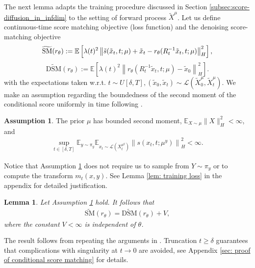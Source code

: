 \documentclass[10pt]{article} %
\newcommand{\E}{\mathbb{E}}
\theoremstyle{plain}
\newtheorem{lemma}[theorem]{Lemma}
\theoremstyle{definition}
\newtheorem{assumption}[theorem]{Assumption}
\theoremstyle{remark}
\renewcommand{\L}{\mathscr{L}}
\newcommand{\norm}[1]{\left\|#1\right\|}
\begin{document}
The next lemma adapts the training procedure discussed in Section \ref{subsec:score-diffusion_in_infdim} to the setting of forward process $\widetilde X^{\mu}$. Let us define continuous-time score matching objective (loss function) and the denoising score-matching objective 
\begin{equation*}\label{eq:loss-objective}
     \widetilde{\mathrm{SM}}(r_\theta) := \E\left[\lambda(t)^2\norm{\Tilde{s}(\tilde x_t, t; \mu) + \tilde x_t -r_\theta(R_t^{-1} \tilde x_t, t; \mu)}_H^2\right],
\end{equation*}
    \begin{equation*}
        \widetilde{\mathrm{DSM}}(r_\theta) := \E \left[\lambda(t)^2 \norm{r_\theta(R_t^{-1} \tilde x_t, t; \mu) - \tilde x_0}_H^2\right].
    \end{equation*}
with the expectations taken w.r.t. $ t \sim U[\delta, T], (\tilde x_0, \tilde x_t) \sim \L(\widetilde{X}^{\mu}_0, \widetilde{X}_t^{\mu})$.
We make an assumption regarding the boundedness of the second moment of the conditional score uniformly in time following \citet{baldassari2024conditional}.
\begin{assumption}\label{ass: stability estimate; no forward process}
       The prior $\mu$ has bounded second moment, $\E_{X\sim\mu}\|X\|_H^2 < \infty$, and
    \begin{eqnarray*}
    \sup_{t \in [\delta, T]} \E_{y \sim \pi_y} \E_{x_t \sim \L(X_t^{\mu^y})} \norm{ s(x_t, t; \mu^y)}_H^2 < \infty.
\end{eqnarray*}

\end{assumption}
Notice that Assumption \ref{ass: stability estimate; no forward process} does not require us to sample from $Y \sim \pi_y$ or to compute the transform $m_t(x, y)$. See Lemma \ref{lem: training loss} in the appendix for detailed justification.
\begin{lemma}\label{lem: conditional score matching}
    Let Assumption \ref{ass: stability estimate; no forward process} hold. It follows that
    \begin{eqnarray*}
        \widetilde{\mathrm{SM}}(r_\theta)
        = \widetilde{\mathrm{DSM}}(r_\theta) + V,
    \end{eqnarray*}
    where the constant $V < \infty$ is independent of $\theta$.
\end{lemma}
The result follows from repeating the arguments in \citet{baldassari2024conditional}. 
    Truncation $t\geq \delta$ guarantees that complications with singularity at $t\to 0$ are avoided, see Appendix \ref{sec: proof of conditional score matching} for details.
\end{document}

